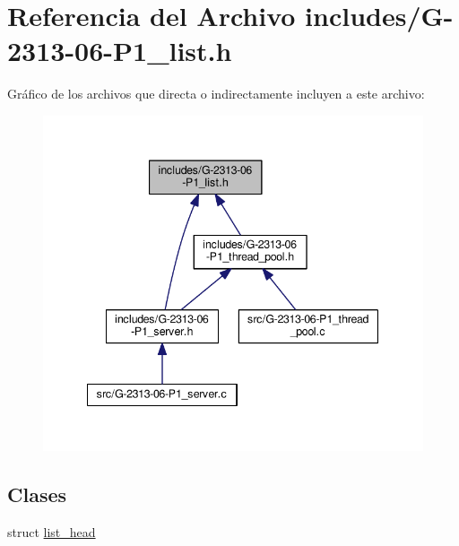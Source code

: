 \hypertarget{G-2313-06-P1__list_8h}{}\section{Referencia del Archivo includes/\+G-\/2313-\/06-\/\+P1\+\_\+list.h}
\label{G-2313-06-P1__list_8h}
Gráfico de los archivos que directa o indirectamente incluyen a este archivo\+:\nopagebreak
\begin{figure}[H]
\begin{center}
\leavevmode
\includegraphics[width=341pt]{G-2313-06-P1__list_8h__dep__incl}
\end{center}
\end{figure}
\subsection*{Clases}
\begin{DoxyCompactItemize}
\item 
struct \hyperlink{structlist__head}{list\+\_\+head}
\end{DoxyCompactItemize}
